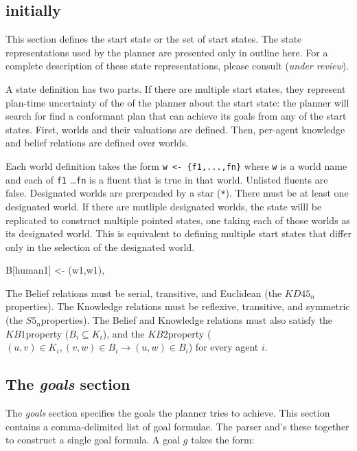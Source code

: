 \documentclass{article}
\newcommand{\kdff}{\ensuremath{KD45_n}}
\newcommand{\sfive}{\ensuremath{S5_n}}
\newcommand{\kbone}{\ensuremath{KB1}}
\newcommand{\kbtwo}{\ensuremath{KB2}}
\begin{document}
{\subsection{initially}

This section defines the start state or the set of start states.
The state representations used by the planner are presented only in outline
here. For a complete description of these state representations, please
consult  (\emph{under review}). 

A state definition has two parts.
If there are multiple start states, they represent
plan-time uncertainty of the of the planner about the start state: the planner
will search for find a conformant plan that can achieve its goals from any of
the start states.
First, worlds and their valuations are
defined. Then, per-agent knowledge and belief relations are defined over worlds.

Each world definition takes the form
\verb|w <- {f1,...,fn}|
where \verb|w| is a world name
and each of \verb|f1| \ldots \verb|fn| is a fluent 
that is true in that world. Unlisted fluents are false.
Designated worlds are prerpended by a star (\verb|*|).
There must be at least one designated world. 
If there are mutliple designated worlds, the state willl be replicated to
construct multiple pointed states, one taking each of those worlds as its
designated world. This is equivalent to defining multiple start states that
differ only in the selection of the designated world.

B[human1] <- {(w1,w1)},

The Belief relations must be serial, transitive, and Euclidean (the \kdff
properties). The Knowledge relations must be reflexive, transitive, and
symmetric (the \sfive properties). The Belief and Knowledge relations must also
satisfy the \kbone property ($B_i \subseteq K_i$), and the \kbtwo property
($(u,v) \in K_i, (v,w) \in B_i \rightarrow (u,w) \in B_i$) for every agent
$i$.



\subsection{The \emph{goals} section}

The \emph{goals} section specifies the goals the planner tries to achieve.
This section contains a comma-delimited list of goal formulae. The parser and's
these together to construct a single goal formula. A goal $g$ takes the form:

}
\end{document}
